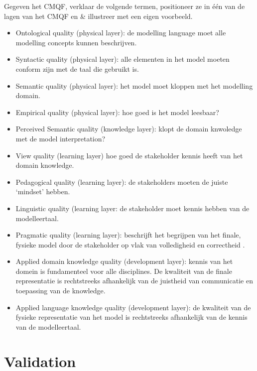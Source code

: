 \documentclass{article}
\begin{document}
\begin{quest}Gegeven het CMQF, verklaar de volgende termen, positioneer ze in \'e\'en van de lagen van het CMQF en \& illustreer met een eigen voorbeeld.
\end{quest}

\begin{itemize}
    \item Ontological quality (physical layer): de modelling language moet alle modelling concepts kunnen beschrijven.
    \item Syntactic quality (physical layer): alle elementen in het model moeten conform zijn met de taal die gebruikt is.
    \item Semantic quality (physical layer): het model moet kloppen met het modelling domain.
    \item Empirical quality (physical layer): hoe goed is het model leesbaar?
    \item Perceived Semantic quality (knowledge layer): klopt de domain knwoledge met de model interpretation?
    \item View quality (learning layer) hoe goed de stakeholder kennis heeft van het domain knowledge.
    \item Pedagogical quality (learning layer): de stakeholders moeten de juiste `mindset' hebben.
    \item Linguistic quality (learning layer: de stakeholder moet kennis hebben van de modelleertaal.
    \item Pragmatic quality (learning layer): beschrijft het begrijpen van het finale, fysieke model door de stakeholder op vlak van volledigheid en correctheid .
    \item Applied domain knowledge quality (development layer): kennis van het domein is fundamenteel voor alle disciplines. De kwaliteit van de finale representatie is rechtstreeks afhankelijk van de juistheid van communicatie en toepassing van de knowledge.
    \item Applied language knowledge quality (development layer): de kwaliteit van de fysieke representatie van het model is rechtstreeks afhankelijk van de kennis van de modelleertaal.
\end{itemize}

\section{Validation}
\end{document}
